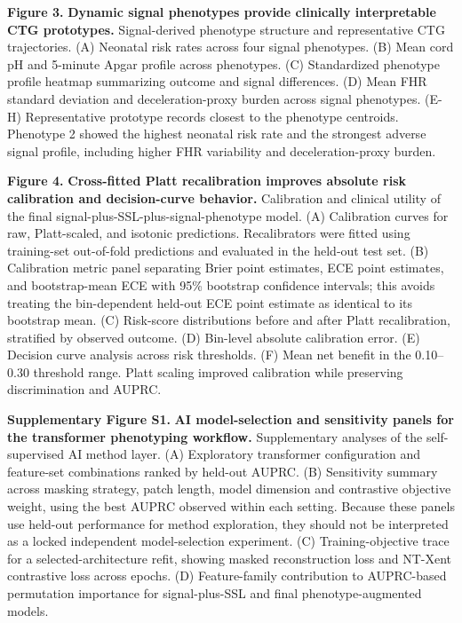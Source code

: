 \documentclass[11pt]{article}
\begin{document}
\noindent\textbf{Figure 3.} \textbf{Dynamic signal phenotypes provide clinically interpretable CTG prototypes.}
  Signal-derived phenotype structure and representative CTG trajectories. (A) Neonatal risk rates across four signal phenotypes. (B) Mean cord pH and 5-minute Apgar profile across phenotypes. (C) Standardized phenotype profile heatmap summarizing outcome and signal differences. (D) Mean FHR standard deviation and deceleration-proxy burden across signal phenotypes. (E-H) Representative prototype records closest to the phenotype centroids. Phenotype 2 showed the highest neonatal risk rate and the strongest adverse signal profile, including higher FHR variability and deceleration-proxy burden.

\noindent\textbf{Figure 4.} \textbf{Cross-fitted Platt recalibration improves absolute risk calibration and decision-curve behavior.}
  Calibration and clinical utility of the final signal-plus-SSL-plus-signal-phenotype model. (A) Calibration curves for raw, Platt-scaled, and isotonic predictions. Recalibrators were fitted using training-set out-of-fold predictions and evaluated in the held-out test set. (B) Calibration metric panel separating Brier point estimates, ECE point estimates, and bootstrap-mean ECE with 95\% bootstrap confidence intervals; this avoids treating the bin-dependent held-out ECE point estimate as identical to its bootstrap mean. (C) Risk-score distributions before and after Platt recalibration, stratified by observed outcome. (D) Bin-level absolute calibration error. (E) Decision curve analysis across risk thresholds. (F) Mean net benefit in the 0.10--0.30 threshold range. Platt scaling improved calibration while preserving discrimination and AUPRC.

\noindent\textbf{Supplementary Figure S1.} \textbf{AI model-selection and sensitivity panels for the transformer phenotyping workflow.}
  Supplementary analyses of the self-supervised AI method layer. (A) Exploratory transformer configuration and feature-set combinations ranked by held-out AUPRC. (B) Sensitivity summary across masking strategy, patch length, model dimension and contrastive objective weight, using the best AUPRC observed within each setting. Because these panels use held-out performance for method exploration, they should not be interpreted as a locked independent model-selection experiment. (C) Training-objective trace for a selected-architecture refit, showing masked reconstruction loss and NT-Xent contrastive loss across epochs. (D) Feature-family contribution to AUPRC-based permutation importance for signal-plus-SSL and final phenotype-augmented models.
\end{document}
